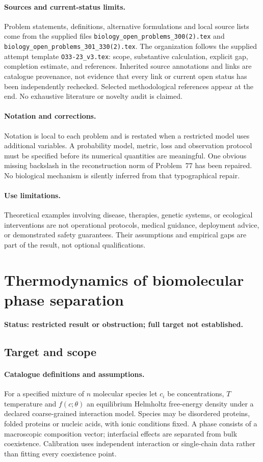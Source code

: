 \documentclass[11pt]{article}
\begin{document}
\paragraph{Sources and current-status limits.}
Problem statements, definitions, alternative formulations and local source lists
come from the supplied files
\texttt{biology\_open\_problems\_300(2).tex} and
\texttt{biology\_open\_problems\_301\_330(2).tex}.
The organization follows the supplied attempt template
\texttt{O33-23\_v3.tex}: scope, substantive calculation, explicit gap,
completion estimate, and references. Inherited source annotations and links are
catalogue provenance, not evidence that every link or current open status has
been independently rechecked. Selected methodological references appear at the
end. No exhaustive literature or novelty audit is claimed.

\paragraph{Notation and corrections.}
Notation is local to each problem and is restated when a restricted model uses
additional variables. A probability model, metric, loss and observation protocol
must be specified before its numerical quantities are meaningful. One obvious
missing backslash in the reconstruction norm of Problem~77 has been repaired.
No biological mechanism is silently inferred from that typographical repair.

\paragraph{Use limitations.}
Theoretical examples involving disease, therapies, genetic systems, or ecological
interventions are not operational protocols, medical guidance, deployment advice,
or demonstrated safety guarantees. Their assumptions and empirical gaps are part
of the result, not optional qualifications.


\section*{Thermodynamics of biomolecular phase separation}
\label{prob:090}
\noindent\textbf{Status: restricted result or obstruction; full target not established.}
\subsection{Target and scope}
\paragraph{Catalogue definitions and assumptions.}
For a specified mixture of $n$ molecular species let $c_i$ be concentrations, $T$ temperature and $f(c;\theta)$ an equilibrium Helmholtz free-energy density under a declared coarse-grained interaction model. Species may be disordered proteins, folded proteins or nucleic acids, with ionic conditions fixed. A phase consists of a macroscopic composition vector; interfacial effects are separated from bulk coexistence. Calibration uses independent interaction or single-chain data rather than fitting every coexistence point.
\end{document}
